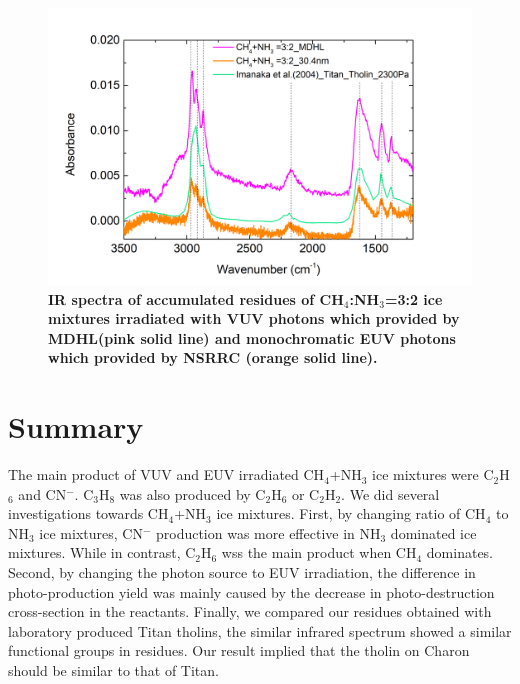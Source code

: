\begin{figure}
\centering
\includegraphics[width=\textwidth]{figures/chapter3/residue.png}
\caption{\textbf{IR spectra of accumulated residues of CH$_4$:NH$_3$=3:2 ice mixtures irradiated with VUV photons which provided by MDHL(pink solid line) and  monochromatic EUV photons which provided by NSRRC (orange solid line).}}
\label{fig:residues}
\end{figure}


\section{Summary} %

The main product of VUV and EUV irradiated CH$_4$+NH$_3$ ice mixtures were C$_2$H$_6$ and CN$^-$. C$_3$H$_8$ was also produced by C$_2$H$_6$ or C$_2$H$_2$. We did several investigations towards CH$_4$+NH$_3$ ice mixtures. First, by changing ratio of CH$_4$ to NH$_3$ ice mixtures, CN$^-$ production was more effective in NH$_3$ dominated ice mixtures. While in contrast, C$_2$H$_6$ wss the main product when CH$_4$ dominates. Second, by changing the photon source to EUV irradiation, the difference in photo-production yield was mainly caused by the decrease in photo-destruction cross-section in the reactants. Finally, we compared our residues obtained with laboratory produced Titan tholins, the similar infrared spectrum showed a similar functional groups in residues. Our result implied that the tholin on Charon should be similar to that of Titan.


